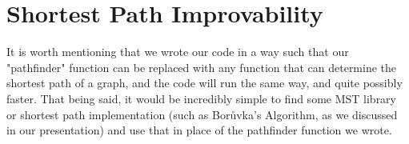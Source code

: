 \documentclass[12pt,letterpaper]{article}
\begin{document}
\section*{Shortest Path Improvability}
It is worth mentioning that we wrote our code in a way such that our "pathfinder" function can be replaced with any function that can determine the shortest path of a graph, and the code will run the same way, and quite possibly faster. That being said, it would be incredibly simple to find some MST library or shortest path implementation (such as Bor\r{u}vka's Algorithm, as we discussed in our presentation) and use that in place of the pathfinder function we wrote.

\newpage
\end{document}
